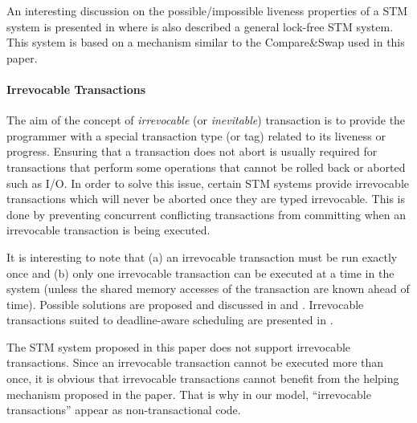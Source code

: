 An interesting discussion on the possible/impossible liveness properties 
of a STM system is presented in \cite{GK10} where is 
also described  a general  lock-free STM system. This  system is 
based on a mechanism similar to the Compare\&Swap used in this paper.

\paragraph{Irrevocable Transactions} 
The  aim  of  the  concept   of  {\it  irrevocable}  (or  {\it  inevitable})
transaction  is  to   provide  the   programmer  with  a  special 
transaction type (or tag) related to its liveness or progress. 
%
Ensuring  that  a  transaction  does  not abort  is  usually  required  for
transactions  
that perform some operations that cannot be rolled back or aborted such as I/O.
In order to solve this issue, certain STM systems provide irrevocable 
transactions which will never be aborted once they are typed  irrevocable.
This is done by preventing concurrent conflicting transactions from 
committing when an irrevocable transaction is being executed.

It is interesting to note that (a) an irrevocable transaction must be run 
exactly  once and (b) only one irrevocable transaction can be executed at 
a time in the system (unless the shared memory accesses of the transaction 
are known ahead of time).
Possible solutions are proposed and discussed  in 
\cite{SSDMS08}  and   \cite{WSA08}.  Irrevocable  transactions   suited  to
deadline-aware scheduling are presented  in \cite{MMFLMR11}. 

The STM system proposed in this paper does not support 
irrevocable transactions.
Since  an irrevocable   transaction cannot  be executed  more than  once,
it is obvious that irrevocable  transactions cannot  benefit from  the  
helping  mechanism  proposed in  the paper. 
%
%
That is why in our
model,  ``irrevocable transactions'' appear as non-transactional code. 



